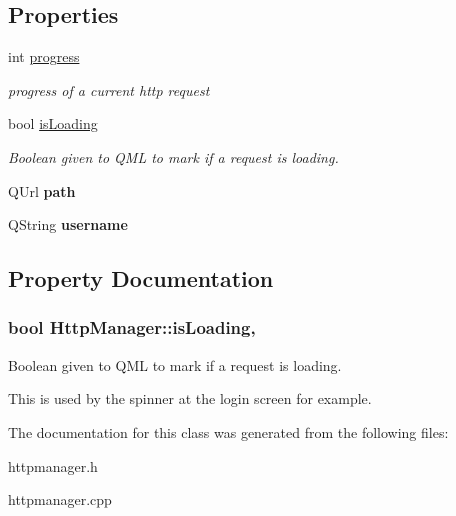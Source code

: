 \subsection*{Properties}
\begin{DoxyCompactItemize}
\item 
\hypertarget{classHttpManager_a090619732438afb63e0605bc1bb2d33f}{int \hyperlink{classHttpManager_a090619732438afb63e0605bc1bb2d33f}{progress}}\label{classHttpManager_a090619732438afb63e0605bc1bb2d33f}

\begin{DoxyCompactList}\small\item\em progress of a current http request \end{DoxyCompactList}\item 
bool \hyperlink{classHttpManager_aa2f331facd6aeaff68c6f424f10bbce5}{is\-Loading}
\begin{DoxyCompactList}\small\item\em Boolean given to Q\-M\-L to mark if a request is loading. \end{DoxyCompactList}\item 
\hypertarget{classHttpManager_aa32509947efe9fbdfd54b88516969af8}{Q\-Url {\bfseries path}}\label{classHttpManager_aa32509947efe9fbdfd54b88516969af8}

\item 
\hypertarget{classHttpManager_a7d7b4a614a7e7a7950710e16e3790638}{Q\-String {\bfseries username}}\label{classHttpManager_a7d7b4a614a7e7a7950710e16e3790638}

\end{DoxyCompactItemize}


\subsection{Property Documentation}
\hypertarget{classHttpManager_aa2f331facd6aeaff68c6f424f10bbce5}{
\subsubsection[{is\-Loading}]{\setlength{\rightskip}{0pt plus 5cm}bool Http\-Manager\-::is\-Loading\hspace{0.3cm}{\ttfamily [read]}, {\ttfamily [write]}}}\label{classHttpManager_aa2f331facd6aeaff68c6f424f10bbce5}


Boolean given to Q\-M\-L to mark if a request is loading. 

This is used by the spinner at the login screen for example. 

The documentation for this class was generated from the following files\-:\begin{DoxyCompactItemize}
\item 
httpmanager.\-h\item 
httpmanager.\-cpp\end{DoxyCompactItemize}
